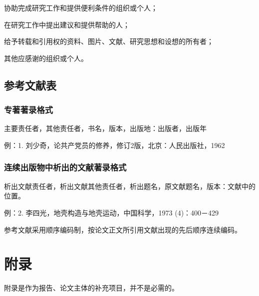 \documentclass[oneside, phd]{njuthesis}
\begin{document}
协助完成研究工作和提供便利条件的组织或个人；

在研究工作中提出建议和提供帮助的人；

给予转载和引用权的资料、图片、文献、研究思想和设想的所有者；

其他应感谢的组织或个人。

\subsection{参考文献表}

\subsubsection{专著著录格式}

主要责任者，其他责任者，书名，版本，出版地：出版者，出版年

例：1. 刘少奇，论共产党员的修养，修订2版，北京：人民出版社，1962

\subsubsection{连续出版物中析出的文献著录格式}

析出文献责任者，析出文献其他责任者，析出题名，原文献题名，版本：文献中的位置。

例：2. 李四光，地壳构造与地壳运动，中国科学，1973 (4)：400－429

参考文献采用顺序编码制，按论文正文所引用文献出现的先后顺序连续编码。

\section{附录}

附录是作为报告、论文主体的补充项目，并不是必需的。
\end{document}
